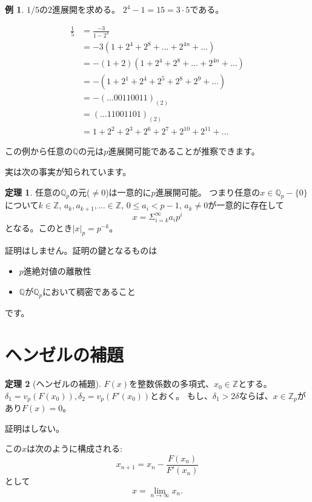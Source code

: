 \documentclass[uplatex]{jsarticle}
\newcommand{\Z}{\mathbb{Z}}
\newcommand{\Q}{\mathbb{Q}}
\theoremstyle{definition} %
\newtheorem{thm}{定理}
\newtheorem*{example*}{例}
\begin{document}
\begin{example*}
$1/5$の$2$進展開を求める。
$2^4-1 = 15 = 3 \cdot 5$である。

\begin{align*}
\frac{1}{5} &= \frac{-3}{1-2^4} \\
&= -3 (1 + 2^4 + 2^8 + \dots+ 2^{4n} + \dots) \\
&= -(1+2) (1 + 2^4 + 2^8 + \dots+ 2^{4n} + \dots) \\
&= -(1 + 2^1 + 2^4 + 2^5 + 2^8 + 2^9 + \dots) \\
&= -(\dots 00110011)_{(2)} \\
&= (\dots 11001101)_{(2)} \\
&= 1 + 2^2 + 2^3 + 2^6 + 2^7 + 2^{10} + 2^{11} + \dots
\end{align*}
\end{example*}

この例から任意の$\Q$の元は$p$進展開可能であることが推察できます。

実は次の事実が知られています。
\begin{oframed}\begin{thm}
任意の$\Q_p$の元($\ne 0$)は一意的に$p$進展開可能。
つまり任意の$x \in \Q_p- \{0\}$について$k \in \Z$, $a_k, a_{k+1}, \dots \in \Z$, $0 \le a_i < p-1$, $a_k \ne 0$が一意的に存在して
\[x = \Sigma_{i=k}^\infty a_i p^i\]
となる。このとき$|x|_p = p^{-k}$。
\end{thm}\end{oframed}
証明はしません。証明の鍵となるものは
\begin{itemize}
\item $p$進絶対値の離散性
\item $\Q$が$\Q_p$において稠密であること
\end{itemize}
です。

\section{ヘンゼルの補題}

\begin{oframed}\begin{thm}[ヘンゼルの補題]
$F(x)$を整数係数の多項式、$x_0 \in \Z$とする。
$\delta_1 = v_p(F(x_0)), \delta_2 = v_p(F'(x_0))$とおく。
もし、$\delta_1 > 2 \delta$ならば、$x \in \Z_p$があり$F(x)=0$。
\end{thm}\end{oframed}
証明はしない。

この$x$は次のように構成される:
\[x_{n+1} = x_n - \frac{F(x_n)}{F'(x_n)}\]
として
\[x = \lim_{n\to\infty}x_n.\]
\end{document}
